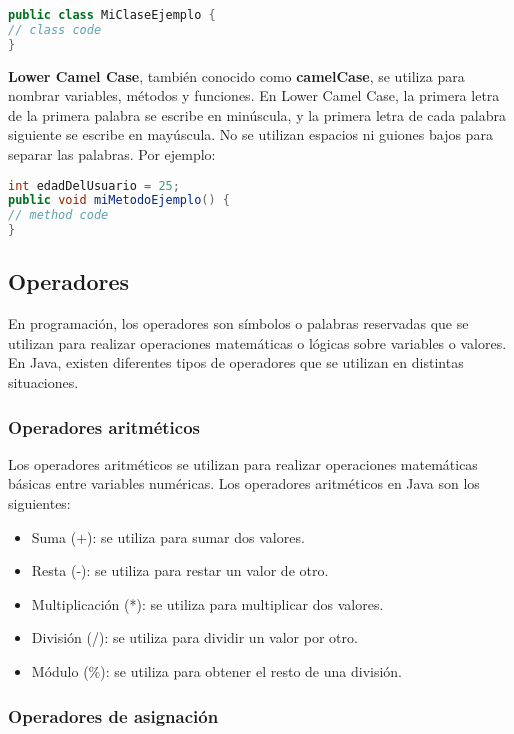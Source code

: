 \documentclass{article}
\begin{document}
\begin{lstlisting}[language=Java]
public class MiClaseEjemplo {
// class code
}
\end{lstlisting}

\textbf{Lower Camel Case}, también conocido como \textbf{camelCase}, se utiliza para nombrar variables, métodos y funciones. En Lower Camel Case, la primera letra de la primera palabra se escribe en minúscula, y la primera letra de cada palabra siguiente se escribe en mayúscula. No se utilizan espacios ni guiones bajos para separar las palabras. Por ejemplo:

\begin{lstlisting}[language=Java]
int edadDelUsuario = 25;
public void miMetodoEjemplo() {
// method code
}
\end{lstlisting}

\subsection{Operadores}
En programación, los operadores son símbolos o palabras reservadas que se utilizan para realizar operaciones matemáticas o lógicas sobre variables o valores. En Java, existen diferentes tipos de operadores que se utilizan en distintas situaciones.

\subsubsection*{Operadores aritméticos}

Los operadores aritméticos se utilizan para realizar operaciones matemáticas básicas entre variables numéricas. Los operadores aritméticos en Java son los siguientes:

\begin{itemize}
\item Suma (+): se utiliza para sumar dos valores.
\item Resta (-): se utiliza para restar un valor de otro.
\item Multiplicación (*): se utiliza para multiplicar dos valores.
\item División (/): se utiliza para dividir un valor por otro.
\item Módulo (\%): se utiliza para obtener el resto de una división.
\end{itemize}

\subsubsection*{Operadores de asignación}
\end{document}
